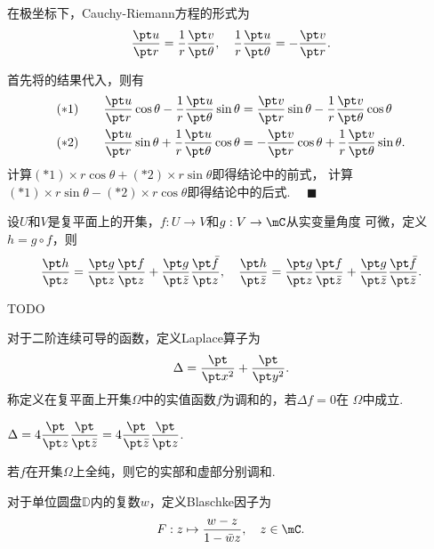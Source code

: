   \begin{thm}
    \label{thm: 极坐标Cauchy-Riemann方程}
    在极坐标下，Cauchy-Riemann方程的形式为
    \[
      \frac{\pt u}{\pt r} = \frac{1}{r}\frac{\pt v}{\pt\theta},\quad
      \frac{1}{r}\frac{\pt u}{\pt\theta} = -\frac{\pt v}{\pt r}.
    \]
  \end{thm}
  \proof
    首先将的结果代入，则有
    \[\begin{split}
      (*1)\qquad\frac{\pt u}{\pt r}\cos\theta - \frac{1}{r}\frac{\pt u}{\pt\theta}\sin\theta
      &= \frac{\pt v}{\pt r}\sin\theta - \frac{1}{r}\frac{\pt v}{\pt\theta}\cos\theta\\
      (*2)\qquad\frac{\pt u}{\pt r}\sin\theta + \frac{1}{r}\frac{\pt u}{\pt\theta}\cos\theta
      &= -\frac{\pt v}{\pt r}\cos\theta + \frac{1}{r}\frac{\pt v}{\pt\theta}\sin\theta.
    \end{split}\]
    计算$(*1)\times r\cos\theta + (*2)\times r\sin\theta$即得结论中的前式，
    计算$(*1)\times r\sin\theta - (*2)\times r\cos\theta$即得结论中的后式.
    $\quad\blacksquare$

  \begin{thm}[链式法则]
    设$U$和$V$是复平面上的开集，$f:U\to V$和$g:V\to\mC$从实变量角度
    可微，定义$h=g\circ f$，则
    \[
      \frac{\pt h}{\pt z}=\frac{\pt g}{\pt z}\frac{\pt f}{\pt z}
      + \frac{\pt g}{\pt\bar{z}}\frac{\pt\bar{f}}{\pt z},\quad
      \frac{\pt h}{\pt\bar{z}} = \frac{\pt g}{\pt z}\frac{\pt f}{\pt\bar{z}}
      + \frac{\pt g}{\pt\bar{z}}\frac{\pt\bar{f}}{\pt\bar{z}}.
    \]
  \end{thm}
  \proof
    TODO

  \begin{defi}[调和]
    对于二阶连续可导的函数，定义Laplace算子为
    \[
      \Delta = \frac{\pt}{\pt x^2} + \frac{\pt}{\pt y^2}.
    \]
    称定义在复平面上开集$\Omega$中的实值函数$f$为调和的，若$\Delta f=0$在
    $\Omega$中成立.
  \end{defi}

  \begin{pos}
    $\Delta = 4\dfrac{\pt}{\pt z}\dfrac{\pt}{\pt\bar{z}}
    = 4\dfrac{\pt}{\pt\bar{z}}\dfrac{\pt}{\pt z}$.
  \end{pos}

  \begin{cor}[调和]
    若$f$在开集$\Omega$上全纯，则它的实部和虚部分别调和.
  \end{cor}

  \begin{defi}[Blaschke因子]
    对于单位圆盘$\mathbb{D}$内的复数$w$，定义Blaschke因子为
    \[
      F: z\mapsto \frac{w-z}{1-\bar{w}z},\quad z\in\mC.
    \]
  \end{defi}

